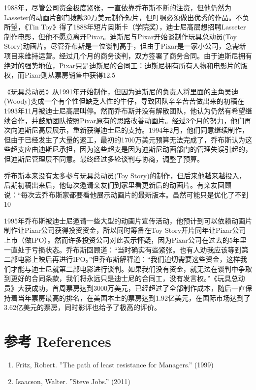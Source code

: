 1988年，尽管公司资金极度紧张，一直依靠乔布斯不断的注资，但他仍然为Lasseter的动画片部门拨款30万美元制作短片，但叮嘱必须做出优秀的作品。不负所望，《Tin Toy》得了1888年短片奥斯卡（学院奖），迪士尼高层想招聘Lasseter制作电影，但他不愿意离开Pixar。迪斯尼与Pixar开始谈制作玩具总动员(Toy Story)动画片。尽管乔布斯是一位谈判高手，但由于Pixar是一家小公司，急需新项目来维持运营。经过几个月的商务谈判，双方签署了商务合同。由于迪斯尼拥有绝对的强势地位，Pixar只是迪斯尼的合同工：迪斯尼拥有所有人物和电影片的版权，而Pixar则从票房销售中获得12.5%

《玩具总动员》从1991年开始制作，但因为迪斯尼的负责人将里面的主角吴迪(Woody)变成一个有个性但缺乏人性的牛仔，导致团队辛辛苦苦做出来的初稿在1993年11月被迪士尼高层叫停。然而乔布斯并没有解散团队，他认为仍然有希望继续合作，并鼓励团队按照Pixar原有的思路改善动画片。经过3个月的努力，他们再次向迪斯尼高层展示，重新获得迪士尼的支持。1994年2月，他们同意继续制作，但由于已经发生了大量的返工，最初的1700万美元预算无法完成了，乔布斯认为这些超支应由迪斯尼承担，因为这些超支是因为迪斯尼动画部门的管理失误引起的，但迪斯尼管理层不同意。最终经过多轮谈判与协商，调整了预算。

乔布斯本来没有太多参与玩具总动员(Toy Story)的制作，但后来他越来越投入，后期初稿出来后，他每次邀请亲友们到家里看更新后的动画片。有亲友回顾说：“每次去乔布斯家都要看他展示动画片的最新版本。虽然可能只是优化了不到10%

1995年乔布斯被迪士尼邀请一些大型的动画片宣传活动，他预计到可以依赖动画片制作让Pixar公司获得投资资金，所以同时筹备在Toy Story开片同年让Pixar公司上市（做IPO）。然而许多投资公司对此表示怀疑，因为Pixar公司在过去的5年里一直处于亏损状态。乔布斯回顾道：“当时确实有些紧张。也有人劝我应该等到第二部电影上映后再进行IPO。”但乔布斯解释道：“我们迫切需要这些资金，这样我们才能与迪士尼就第二部电影进行谈判。如果我们没有资金，就无法在谈判中争取到更好的合同条款，我们将永远只是迪士尼的合同工，没有发言权。”《玩具总动员》大获成功，首周票房达到3000万美元，已经超过了全部制作成本，随后一直保持着当年票房最高的排名，在美国本土的票房达到1.92亿美元，在国际市场达到了3.62亿美元的票房，同时影评也给予了极高的评价。

\hypertarget{ux9644ux4ef6}{%
\section{参考 References}\label{ux9644ux4ef6}}

\begin{enumerate}
\tightlist
\item
  Fritz, Robert. ''The path of least resistance for Managers.'' (1999)
\item
  Isaacson, Walter. ''Steve Jobs.'' (2011)
\end{enumerate}




